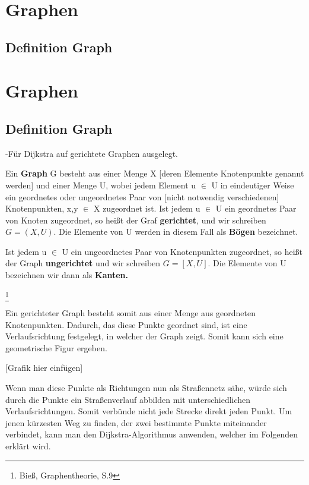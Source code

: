 \chapter{Graphen}

\section{Definition Graph}

\chapter{Graphen}

\section{Definition Graph}


-Für Dijkstra auf gerichtete Graphen ausgelegt.

\begin{theorem}
Ein \textbf{Graph} G besteht aus einer Menge X [deren Elemente Knotenpunkte genannt werden] und einer Menge U, wobei jedem Element u $\in$ U in eindeutiger Weise ein geordnetes oder ungeordnetes Paar von [nicht notwendig verschiedenen] Knotenpunkten, x,y $\in$ X zugeordnet ist.
Ist jedem u $\in$ U ein geordnetes Paar von Knoten zugeordnet, so heißt der Graf \textbf{gerichtet}, und wir schreiben 
	$G= (X, U)$.
Die Elemente von U werden in diesem Fall als \textbf{Bögen} bezeichnet.

Ist jedem u $\in$ U ein ungeordnetes Paar von Knotenpunkten zugeordnet, so heißt der Graph \textbf{ungerichtet} und wir schreiben 
	$G=[X,U]$. 
Die Elemente von U bezeichnen wir dann als \textbf{Kanten.}
\end{theorem} \footnote{Bieß, Graphentheorie, S.9}


Ein gerichteter Graph besteht somit aus einer Menge aus geordneten Knotenpunkten. Dadurch, das diese Punkte geordnet sind, ist eine Verlaufsrichtung festgelegt, in welcher der Graph zeigt.
Somit kann sich eine geometrische Figur ergeben.


[Grafik hier einfügen]


Wenn man diese Punkte als Richtungen nun als Straßennetz sähe, würde sich durch die Punkte ein Straßenverlauf abbilden mit unterschiedlichen Verlaufsrichtungen.
Somit verbünde nicht jede Strecke direkt jeden Punkt. Um jenen kürzesten Weg zu finden, der zwei bestimmte Punkte miteinander verbindet, kann man den Dijkstra-Algorithmus anwenden, welcher im Folgenden erklärt wird.



